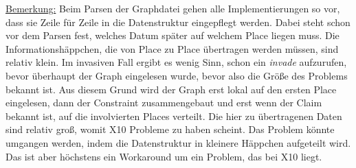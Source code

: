 \underline{Bemerkung:}
Beim Parsen der Graphdatei gehen alle Implementierungen so vor, dass sie Zeile für Zeile in die Datenstruktur eingepflegt werden. Dabei steht schon vor dem Parsen fest, welches Datum später auf welchem Place liegen muss. Die Informationshäppchen, die von Place zu Place übertragen werden müssen, sind relativ klein. Im invasiven Fall ergibt es wenig Sinn, schon ein \textit{invade} aufzurufen, bevor überhaupt der Graph eingelesen wurde, bevor also die Größe des Problems bekannt ist. Aus diesem Grund wird der Graph erst lokal auf den ersten Place eingelesen, dann der Constraint zusammengebaut und erst wenn der Claim bekannt ist, auf die involvierten Places verteilt. Die hier zu übertragenen Daten sind relativ groß, womit X10 Probleme zu haben scheint. Das Problem könnte umgangen werden, indem die Datenstruktur in kleinere Häppchen aufgeteilt wird. Das ist aber höchstens ein Workaround um ein Problem, das bei X10 liegt.
